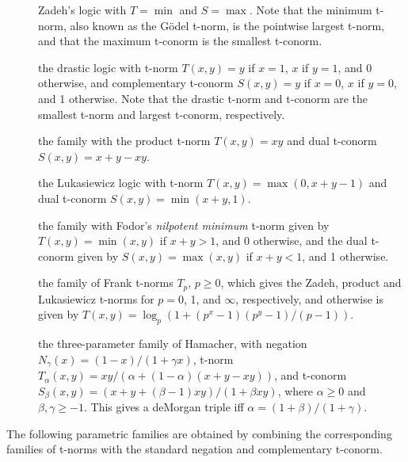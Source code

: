 \documentclass[article]{jss}
\newcommand{\eqn}[1]{$#1$}
\begin{document}
\begin{appendix}
  \begin{description}
    \item[]{Zadeh's logic with \eqn{T = \min} and
      \eqn{S = \max}.  Note that the minimum t-norm, also known as the
      G{\"o}del t-norm, is the pointwise largest t-norm, and that the
      maximum t-conorm is the smallest t-conorm.}
    \item[]{the drastic logic with t-norm
      \eqn{T(x, y) = y} if \eqn{x = 1}, \eqn{x} if \eqn{y = 1}, and 0
      otherwise, and complementary t-conorm \eqn{S(x, y) = y} if
      \eqn{x = 0}, \eqn{x} if \eqn{y = 0}, and 1 otherwise.  Note that
      the drastic t-norm and t-conorm are the smallest t-norm and
      largest t-conorm, respectively.}
    \item[]{the family with the product t-norm
      \eqn{T(x, y) = xy} and dual t-conorm \eqn{S(x, y) = x + y - xy}.}
    \item[]{the Lukasiewicz logic with t-norm
      \eqn{T(x, y) = \max(0, x + y - 1)} and dual t-conorm
      \eqn{S(x, y) = \min(x + y, 1)}.}
    \item[]{the family with Fodor's \emph{nilpotent
	minimum} t-norm given by \eqn{T(x, y) = \min(x, y)} if
      \eqn{x + y > 1}, and 0 otherwise, and the dual t-conorm given by
    \eqn{S(x, y) = \max(x, y)} if \eqn{x + y < 1}, and 1 otherwise.}
    \item[]{the family of Frank t-norms \eqn{T_p},
      \eqn{p \ge 0}, which gives the Zadeh, product and Lukasiewicz
      t-norms for \eqn{p = 0}, 1, and \eqn{\infty}, respectively,
      and otherwise is given by
      \eqn{T(x, y) = \log_p (1 + (p^x - 1) (p^y - 1) / (p - 1))}.}
    \item[]{the three-parameter family of Hamacher,
      with negation \eqn{N_\gamma(x) = (1 - x) / (1 + \gamma x)},
      t-norm  \eqn{T_\alpha(x, y) = xy / (\alpha + (1 - \alpha)(x + y - xy))},
      and t-conorm
      \eqn{S_\beta(x, y) = (x + y + (\beta - 1) xy) / (1 + \beta xy)},
      where \eqn{\alpha \ge 0} and \eqn{\beta, \gamma \ge -1}.  This
      gives a deMorgan triple iff \eqn{\alpha = (1 + \beta) / (1 +
	\gamma)}.}
  \end{description}

  \noindent The following parametric families are obtained by combining the
  corresponding families of t-norms with the standard negation and
  complementary t-conorm.


\end{appendix}
\end{document}
